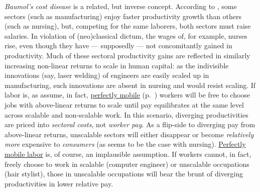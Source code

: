 \begin{enumerate}
	\emph{Baumol's cost disease} is a related, but inverse concept.
According to \cite{Baumol1965}, some sectors (such as  manufacturing) enjoy faster productivity growth than others (such as nursing), but, competing for the same laborers, both sectors must raise salaries.
In violation of (neo)classical dictum, the wages of, for example, nurses rise, even though they have --- supposedly --- not concomitantly gained in productivity.
Much of these sectoral productivity gains are reflected in similarly increasing non-linear returns to scale in human capital:
as the indivisible innovations (say, laser welding) of engineers are easily scaled up in manufacturing, such innovations are absent in nursing and would resist scaling.
If labor is, as \cite{Baumol1965} assume, in fact, \hyperref[itm:perfect-factor-mobility]{perfectly mobile} (p.~\pageref{sec:perfect-competition}) workers will be free to choose jobs with above-linear returns to scale until pay equilibrates at the same level across scalable and non-scalable work.
In this scenario, diverging productivities are priced into \emph{sectoral costs}, not \emph{worker pay}.
As a flip-side to diverging pay from above-linear returns, unscalable sectors will either disappear or become \emph{relatively more} expensive to \emph{consumers} (as seems to be the case with nursing).
\hyperref[itm:perfect-factor-mobility]{Perfectly mobile labor} is, of course, an implausible assumption.
If workers cannot, in fact, freely choose to work in scalable (computer engineer) or unscalable occupations (hair stylist), those in unscalable occupations will bear the brunt of diverging productivities in lower relative pay.


\end{enumerate}

